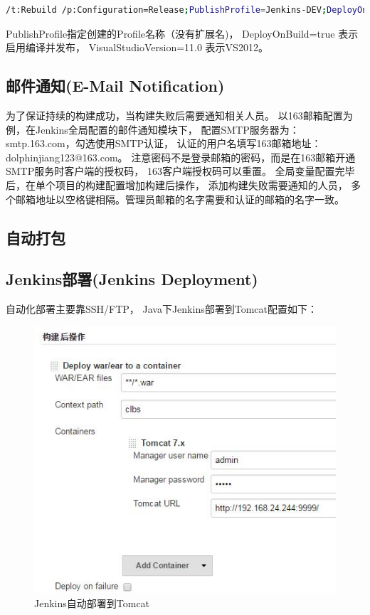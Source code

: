 \documentclass{book}
\begin{document}
\begin{lstlisting}[language=Bash]
/t:Rebuild /p:Configuration=Release;PublishProfile=Jenkins-DEV;DeployOnBuild=true;VisualStudioVersion=11.0   
\end{lstlisting}

PublishProfile指定创建的Profile名称（没有扩展名)，
DeployOnBuild=true 表示启用编译并发布，
VisualStudioVersion=11.0 表示VS2012。

\subsection{邮件通知(E-Mail Notification)}

为了保证持续的构建成功，当构建失败后需要通知相关人员。
以163邮箱配置为例，在Jenkins全局配置的邮件通知模块下，
配置SMTP服务器为：smtp.163.com，勾选使用SMTP认证，
认证的用户名填写163邮箱地址：dolphinjiang123@163.com。
注意密码不是登录邮箱的密码，而是在163邮箱开通SMTP服务时客户端的授权码，
163客户端授权码可以重置。
全局变量配置完毕后，在单个项目的构建配置增加构建后操作，
添加构建失败需要通知的人员，
多个邮箱地址以空格键相隔。管理员邮箱的名字需要和认证的邮箱的名字一致。

\subsection{自动打包}

\subsection{Jenkins部署(Jenkins Deployment)}

自动化部署主要靠SSH/FTP，
Java下Jenkins部署到Tomcat配置如下：

\begin{figure}[htbp]
	\centering
	\includegraphics[scale=0.5]{JenkinsTomcatDeployment.jpg}
	\caption{Jenkins自动部署到Tomcat}
	\label{fig:JenkinsTomcatDeployment}
\end{figure}
\end{document}

